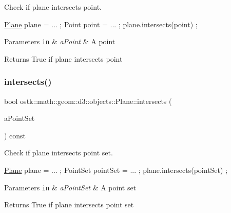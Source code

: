 Check if plane intersects point. 


\begin{DoxyCode}
\hyperlink{classostk_1_1math_1_1geom_1_1d3_1_1objects_1_1_plane_ac66c2a3b3d9d7cd1fd507123091bb38f}{Plane} plane = ... ;
Point point = ... ;
plane.intersects(point) ;
\end{DoxyCode}



\begin{DoxyParams}[1]{Parameters}
\mbox{\tt in}  & {\em a\+Point} & A point \\
\hline
\end{DoxyParams}
\begin{DoxyReturn}{Returns}
True if plane intersects point 
\end{DoxyReturn}
\mbox{\label{classostk_1_1math_1_1geom_1_1d3_1_1objects_1_1_plane_a3545f1d49c58ecf570420461242e3545}} 
\subsubsection{\texorpdfstring{intersects()}{intersects()}\hspace{0.1cm}{\footnotesize\ttfamily [2/5]}}
{\footnotesize\ttfamily bool ostk\+::math\+::geom\+::d3\+::objects\+::\+Plane\+::intersects (\begin{DoxyParamCaption}\item[{const \hyperlink{classostk_1_1math_1_1geom_1_1d3_1_1objects_1_1_point_set}{Point\+Set} \&}]{a\+Point\+Set }\end{DoxyParamCaption}) const}



Check if plane intersects point set. 


\begin{DoxyCode}
\hyperlink{classostk_1_1math_1_1geom_1_1d3_1_1objects_1_1_plane_ac66c2a3b3d9d7cd1fd507123091bb38f}{Plane} plane = ... ;
PointSet pointSet = ... ;
plane.intersects(pointSet) ;
\end{DoxyCode}



\begin{DoxyParams}[1]{Parameters}
\mbox{\tt in}  & {\em a\+Point\+Set} & A point set \\
\hline
\end{DoxyParams}
\begin{DoxyReturn}{Returns}
True if plane intersects point set 
\end{DoxyReturn}
\mbox{\label{classostk_1_1math_1_1geom_1_1d3_1_1objects_1_1_plane_a91bfde1cfff958833f3df94c70c37bcc}} 
